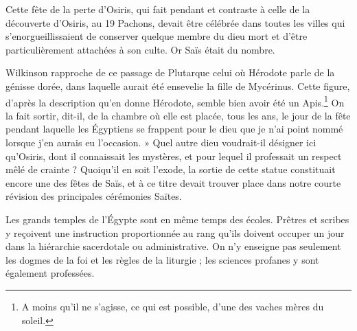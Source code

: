 \documentclass[a4paper, 11pt, oneside]{article}
\begin{document}
Cette fête de la perte d'Osiris, qui fait pendant et contraste à celle de la découverte d'Osiris, au 19 Pachons, devait être célébrée dans toutes les villes qui s'enorgueillissaient de conserver quelque membre du dieu mort et d'être particulièrement attachées à son culte. Or Saïs était du nombre.

Wilkinson rapproche de ce passage de Plutarque celui où Hérodote parle de la génisse dorée, dans laquelle aurait été ensevelie la fille de Mycérinus. Cette figure, d'après la description qu'en donne Hérodote, semble bien avoir été un Apis.\footnote{A moins qu'il ne s'agisse, ce qui est possible, d'une des vaches mères du soleil.} On la fait sortir, dit-il, de la chambre où elle est placée, tous les ans, le jour de la fête pendant laquelle les Égyptiens se frappent pour le dieu que je n'ai point nommé lorsque j'en aurais eu l'occasion. » Quel autre dieu voudrait-il désigner ici qu'Osiris, dont il connaissait les mystères, et pour lequel il professait un respect mêlé de crainte ? Quoiqu'il en soit l'exode, la sortie de cette statue constituait encore une des fêtes de Saïs, et à ce titre devait trouver place dans notre courte révision des principales cérémonies Saïtes.

Les grands temples de l'Égypte sont en même temps des écoles. Prêtres et scribes y reçoivent une instruction proportionnée au rang qu'ils doivent occuper un jour dans la hiérarchie sacerdotale ou administrative. On n'y enseigne pas seulement les dogmes de la foi et les règles de la liturgie ; les sciences profanes y sont également professées.
\end{document}

